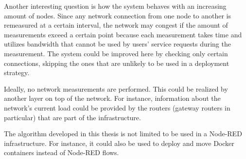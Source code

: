 Another interesting question is how the system behaves with an increasing amount of nodes.
Since any network connection from one node to another is remeasured at a certain interval, the network may congest if the amount of measurements exceed a certain point because each measurement takes time and utilizes bandwidth that cannot be used by users' service requests during the measurement.
The system could be improved here by checking only certain connections, skipping the ones that are unlikely to be used in a deployment strategy.

Ideally, no network measurements are performed.
This could be realized by another layer on top of the network.
For instance, information about the network's current load could be provided by the routers (gateway routers in particular) that are part of the infrastructure.


The algorithm developed in this thesis is not limited to be used in a Node-RED infrastructure.
For instance, it could also be used to deploy and move Docker containers instead of Node-RED flows.